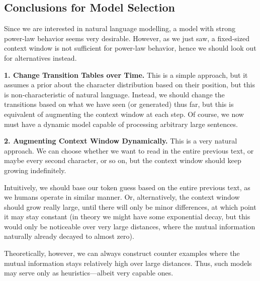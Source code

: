 \documentclass[../../main.tex]{subfiles}
\begin{document}

    \smallskip
\subsection{Conclusions for Model Selection}
    Since we are interested in natural language modelling, a model with strong power-law behavior seems very desirable. However, as we just saw, a fixed-sized context window is not sufficient for power-law behavior, hence we should look out for alternatives instead.

    \textbf{1. Change Transition Tables over Time.} This is a simple approach, but it assumes a prior about the character distribution based on their position, but this is non-characteristic of natural language. Instead, we should change the transitions based on what we have seen (or generated) thus far, but this is equivalent of augmenting the context window at each step. Of course, we now must have a dynamic model capable of processing arbitrary large sentences.

    \textbf{2. Augmenting Context Window Dynamically.} This is a very natural approach. We can choose whether we want to read in the entire previous text, or maybe every second character, or so on, but the context window should keep growing indefinitely.
    
    Intuitively, we should base our token guess based on the entire previous text, as we humans operate in similar manner. Or, alternatively, the context window should grow really large, until there will only be minor differences, at which point it may stay constant (in theory we might have some exponential decay, but this would only be noticeable over very large distances, where the mutual information naturally already decayed to almost zero).

    Theoretically, however, we can always construct counter examples where the mutual information stays relatively high over large distances. Thus, such models may serve only as heuristics—albeit very capable ones.

\end{document}
